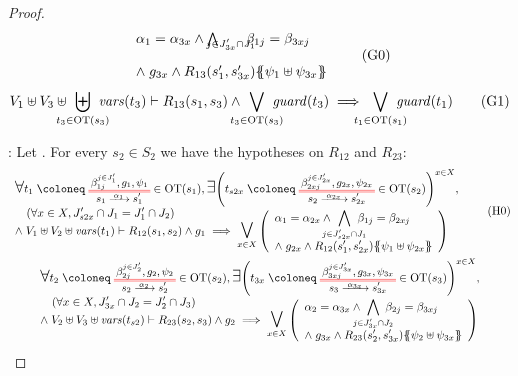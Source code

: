 \documentclass{article}
\begin{document}
\begin{proof}
\begin{multline}
{\begin{array}{l}
			\alpha_1 = \alpha_{3x} \wedge \bigwedge_\subbox{j \in J'_{3x} \cap J_1} \beta_{1j} = \beta_{3xj} \\[12pt]
			\nwedge g_{3x} \wedge R_{13}\mpar{s'_1, s'_{3x}}\psubst{\psi_1 \uplus \psi_{3x}}
		\end{array}} \goal{0}
	\end{multline}
	\[ V_1 \uplus V_3 \uplus \biguplus_\subbox{t_3 \in \fOT{s_3}} \fvars{t_3} \vdash R_{13}\mpar{s_1, s_3} \wedge \bigvee_\subbox{t_3 \in \fOT{s_3}} \fguard{t_3} \implies \bigvee_\subbox{t_1 \in \fOT{s_1}} \fguard{t_1} \goal{1} \]
\item[\goal{0}:] Let .
	For every \(s_2 \in S_2\) we have the hypotheses on \(R_{12}\) and \(R_{23}\):
	\begin{gather}
		\everymath{\displaystyle}\begin{array}{l}
		\bigsymb{\forall} t_1 \defobject \OTx{1}{}{1}{1} \in \fOT{s_1}, \bigsymb{\exists} \mpar{t_{s2x} \defobject \OTx{2}{x}{2x}{2x} \in \fOT{s_2}}^{x \in X}, \\
		\quad \mpar{\forall x \in X, J'_{s2x} \cap J_1 = J'_1 \cap J_2} \\[-10pt]
		\nwedge V_1 \uplus V_2 \uplus \fvars{t_1} \vdash R_{12}\mpar{s_1, s_2} \wedge g_1 \implies \operatorname*{\bigsymb{\bigvee}}_{x \in X} \mpar{\begin{array}{l}
			\alpha_1 = \alpha_{2x} \wedge \bigwedge_\subbox{j \in J'_{s2x} \cap J_1} \beta_{1j} = \beta_{2xj} \\[12pt]
			\nwedge g_{2x} \wedge R_{12}\mpar{s'_1, s'_{2x}}\psubst{\psi_1 \uplus \psi_{2x}}
		\end{array}}
		\end{array} \hyp{0} \\
		\everymath{\displaystyle}\begin{array}{l}
		\bigsymb{\forall} t_2 \defobject \OTx{2}{}{2}{2} \in \fOT{s_2}, \bigsymb{\exists} \mpar{t_{3x} \defobject \OTx{3}{x}{3x}{3x} \in \fOT{s_3}}^{x \in X}, \\
		\quad \mpar{\forall x \in X, J'_{3x} \cap J_2 = J'_2 \cap J_3} \\[-10pt]
		\nwedge V_2 \uplus V_3 \uplus \fvars{t_{s2}} \vdash R_{23}\mpar{s_2, s_3} \wedge g_2 \implies \operatorname*{\bigsymb{\bigvee}}_{x \in X} \mpar{\begin{array}{l}
			\alpha_2 = \alpha_{3x} \wedge \bigwedge_\subbox{j \in J'_{3x} \cap J_2} \beta_{2j} = \beta_{3xj} \\[12pt]
			\nwedge g_{3x} \wedge R_{23}\mpar{s'_2, s'_{3x}}\psubst{\psi_2 \uplus \psi_{3x}}

\end{array}}
\end{array}
\end{gather}
\end{proof}
\end{document}

